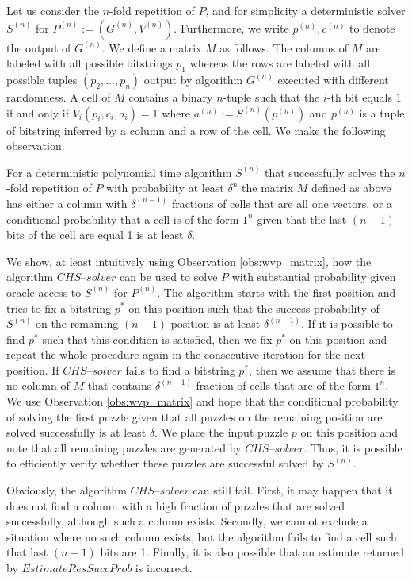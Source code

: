Let us consider the $n$-fold repetition of $P$, and for simplicity a deterministic solver $S^{(n)}$ for $P^{(n)} := (G^{(n)}, V^{(n)})$.
Furthermore, we write $p^{(n)}, c^{(n)}$ to denote the output of $G^{(n)}$.
We define a matrix $M$ as follows. The columns of $M$ are labeled with all possible bitstrings $p_1$
whereas the rows are labeled with all possible tuples $(p_2, \dotsc, p_n)$ output by algorithm $G^{(n)}$
executed with different randomness.
A cell of $M$ contains a binary $n$-tuple such that the $i$-th bit equals $1$ if and only if $V_i(p_i, c_i, a_i) = 1$ where
 $a^{(n)} := S^{(n)}(p^{(n)})$ and $p^{(n)}$ is a tuple of bitstring inferred by a column and a row of the cell.
We make the following observation.
%
\begin{observation}
\label{obs:wvp_matrix}
For a deterministic polynomial time algorithm $S^{(n)}$ that successfully solves the $n$-fold repetition of $P$ with probability at least $\delta^{n}$
the matrix $M$ defined as above has either a column with $\delta^{(n-1)}$ fractions of cells that are all one vectors, or
a conditional probability that a cell is of the form $1^n$ given that the last $(n-1)$ bits of the cell are equal 1 is at least $\delta$.
\end{observation}
%
We show, at least intuitively using Observation \ref{obs:wvp_matrix}, how the algorithm $\mathit{CHS\text{--}solver}$ can be used to solve $P$
with substantial probability given oracle access to $S^{(n)}$ for $P^{(n)}$.
The algorithm starts with the first position and tries to fix a bitstring $p^*$ on this position such that the success probability of $S^{(n)}$ on the remaining $(n-1)$
position is at least $\delta^{(n-1)}$. If it is possible to find $p^*$ such that this condition is satisfied, then we fix $p^*$
on this position and repeat the whole procedure again in the consecutive iteration for the next position.
If $\mathit{CHS\text{--}solver}$ fails to find a bitstring $p^*$, then we assume that there is no column of $M$ that contains $\delta^{(n-1)}$ fraction
of cells that are of the form $1^n$. We use Observation \ref{obs:wvp_matrix} and hope that the conditional probability of
solving the first puzzle given that all puzzles on the remaining position are solved successfully is at least $\delta$.
We place the input puzzle $p$ on this position and note that all remaining puzzles are generated by $\mathit{CHS\text{--}solver}$.
Thus, it is possible to efficiently verify whether these puzzles are successful solved by $S^{(n)}$.

Obviously, the algorithm $\mathit{CHS\text{--}solver}$ can still fail. First, it may happen that it does not find a column
with a high fraction of puzzles that are solved successfully, although such a column exists.
Secondly, we cannot exclude a situation where no such column exists, but the algorithm fails to find a cell such that last $(n\!-\!1)$ bits are 1.
Finally, it is also possible that an estimate returned by $\mathit{EstimateResSuccProb}$ is incorrect.

